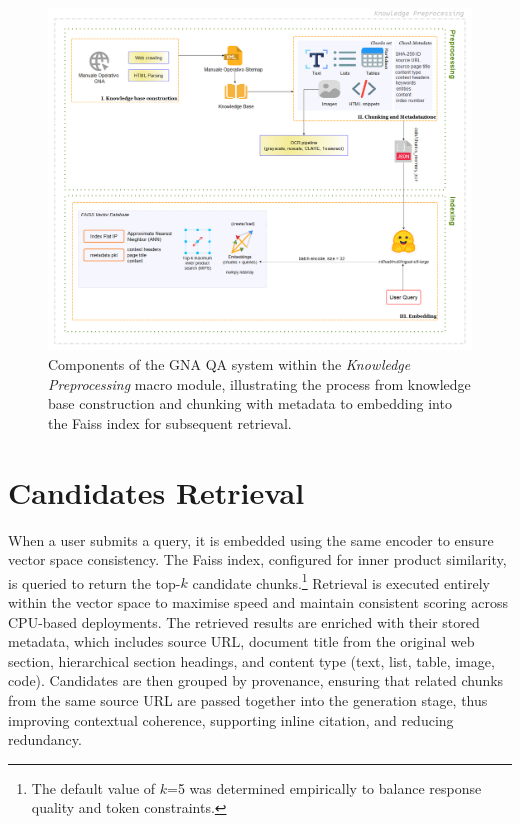 \begin{spacing}{1.5}
\begin{figure}[H]
  \centering
  \includegraphics[width=\textwidth]{images/preprocess_diagram.png} 
  \caption{Components of the GNA QA system within the \textit{Knowledge Preprocessing} macro module, illustrating the process from knowledge base construction and chunking with metadata to embedding into the Faiss index for subsequent retrieval.}
  \label{fig:pre}
\end{figure}

\section{Candidates Retrieval}
When a user submits a query, it is embedded using the same encoder to ensure vector space consistency. The Faiss index, configured for inner product similarity, is queried to return the top-$k$ candidate chunks.\footnote{The default value of $k$=5 was determined empirically to balance response quality and token constraints.} Retrieval is executed entirely within the vector space to maximise speed and maintain consistent scoring across CPU-based deployments. The retrieved results are enriched with their stored metadata, which includes source URL, document title from the original web section, hierarchical section headings, and content type (text, list, table, image, code). Candidates are then grouped by provenance, ensuring that related chunks from the same source URL are passed together into the generation stage, thus improving contextual coherence, supporting inline citation, and reducing redundancy.


\end{spacing}
